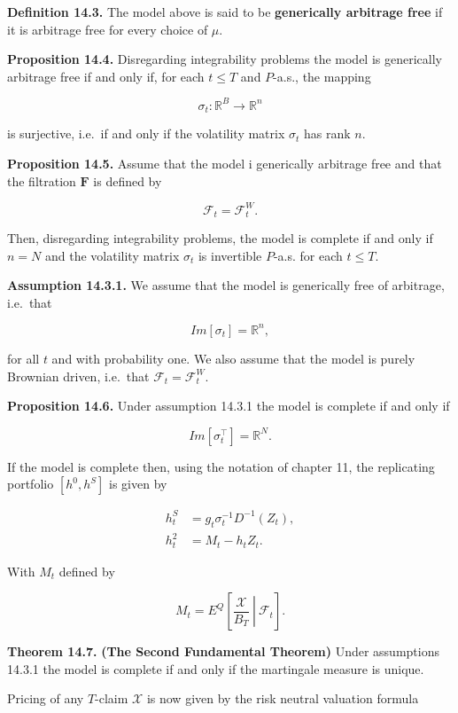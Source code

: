 \documentclass[
]{article}
\begin{document}
\textbf{Definition 14.3.} The model above is said to be
\textbf{generically arbitrage free} if it is arbitrage free for every
choice of \(\mu\).

\textbf{Proposition 14.4.} Disregarding integrability problems the model
is generically arbitrage free if and only if, for each \(t\le T\) and
\(P\)-a.s., the mapping

\[
\sigma_t : \mathbb{R}^B\to \mathbb{R}^n
\]

is surjective, i.e.~if and only if the volatility matrix \(\sigma_t\)
has rank \(n\).

\textbf{Proposition 14.5.} Assume that the model i generically arbitrage
free and that the filtration \(\mathbf{F}\) is defined by

\[
\mathcal{F}_t=\mathcal{F}^W_t.
\]

Then, disregarding integrability problems, the model is complete if and
only if \(n=N\) and the volatility matrix \(\sigma_t\) is invertible
\(P\)-a.s. for each \(t\le T\).

\textbf{Assumption 14.3.1.} We assume that the model is generically free
of arbitrage, i.e.~that

\[
Im[\sigma_t]=\mathbb{R}^n,
\]

for all \(t\) and with probability one. We also assume that the model is
purely Brownian driven, i.e.~that \(\mathcal{F}_t=\mathcal{F}_t^W\).

\textbf{Proposition 14.6.} Under assumption 14.3.1 the model is complete
if and only if

\[
Im[\sigma_t^\top]=\mathbb{R}^N.
\]

If the model is complete then, using the notation of chapter 11, the
replicating portfolio \([h^0,h^S]\) is given by

\begin{align*}
h_t^S&=g_t\sigma_t^{-1}D^{-1}(Z_t),\\
h_t^2&=M_t-h_tZ_t.
\end{align*}

With \(M_t\) defined by

\[
M_t=E^Q\left[\left. \frac{\mathcal{X}}{B_T}\ \right\vert\ \mathcal{F}_t \right].
\]

\textbf{Theorem 14.7.} \textbf{(The Second Fundamental Theorem)} Under
assumptions 14.3.1 the model is complete if and only if the martingale
measure is unique.

Pricing of any \(T\)-claim \(\mathcal{X}\) is now given by the risk
neutral valuation formula
\end{document}
